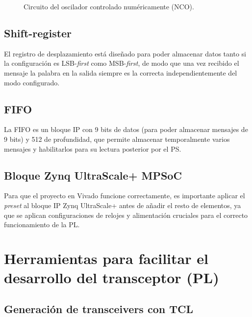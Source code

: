 \begin{figure}[H]
    \centering
    \caption{Circuito del oscilador controlado numéricamente (NCO).}
    \label{fig:nco}
\end{figure}

\subsection{Shift-register}

El registro de desplazamiento está diseñado para poder almacenar datos tanto si la
configuración es LSB-\textit{first} como MSB-\textit{first}, de modo que una vez recibido el mensaje la
palabra en la salida siempre es la correcta independientemente del modo configurado.

\subsection{FIFO}

La FIFO es un bloque IP con 9 bits de datos (para poder almacenar mensajes de 9 bits) y
512 de profundidad, que permite almacenar temporalmente varios mensajes y habilitarlos
para su lectura posterior por el PS.

\subsection{Bloque Zynq UltraScale+ MPSoC}

Para que el proyecto en Vivado funcione correctamente, es importante aplicar el \textit{preset} al
bloque IP Zynq UltraScale+ antes de añadir el resto de elementos, ya que se aplican
configuraciones de relojes y alimentación cruciales para el correcto funcionamiento de la PL.

\section{Herramientas para facilitar el desarrollo del transceptor (PL)}

\subsection{Generación de transceivers con TCL}

